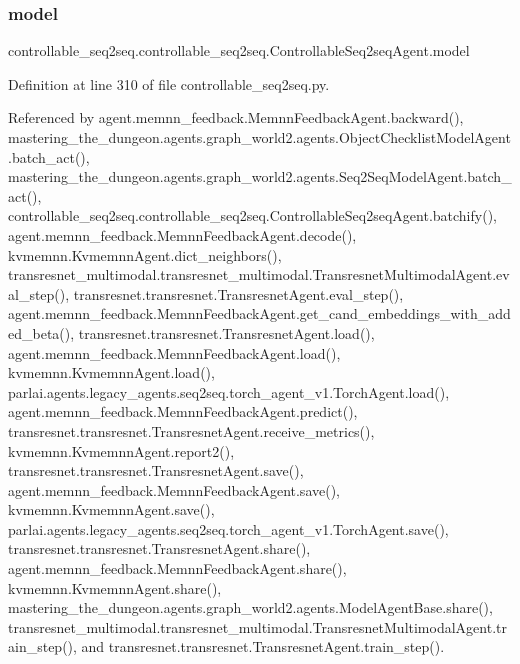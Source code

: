 \subsubsection{\texorpdfstring{model}{model}}
{\footnotesize\ttfamily controllable\+\_\+seq2seq.\+controllable\+\_\+seq2seq.\+Controllable\+Seq2seq\+Agent.\+model}



Definition at line 310 of file controllable\+\_\+seq2seq.\+py.



Referenced by agent.\+memnn\+\_\+feedback.\+Memnn\+Feedback\+Agent.\+backward(), mastering\+\_\+the\+\_\+dungeon.\+agents.\+graph\+\_\+world2.\+agents.\+Object\+Checklist\+Model\+Agent.\+batch\+\_\+act(), mastering\+\_\+the\+\_\+dungeon.\+agents.\+graph\+\_\+world2.\+agents.\+Seq2\+Seq\+Model\+Agent.\+batch\+\_\+act(), controllable\+\_\+seq2seq.\+controllable\+\_\+seq2seq.\+Controllable\+Seq2seq\+Agent.\+batchify(), agent.\+memnn\+\_\+feedback.\+Memnn\+Feedback\+Agent.\+decode(), kvmemnn.\+Kvmemnn\+Agent.\+dict\+\_\+neighbors(), transresnet\+\_\+multimodal.\+transresnet\+\_\+multimodal.\+Transresnet\+Multimodal\+Agent.\+eval\+\_\+step(), transresnet.\+transresnet.\+Transresnet\+Agent.\+eval\+\_\+step(), agent.\+memnn\+\_\+feedback.\+Memnn\+Feedback\+Agent.\+get\+\_\+cand\+\_\+embeddings\+\_\+with\+\_\+added\+\_\+beta(), transresnet.\+transresnet.\+Transresnet\+Agent.\+load(), agent.\+memnn\+\_\+feedback.\+Memnn\+Feedback\+Agent.\+load(), kvmemnn.\+Kvmemnn\+Agent.\+load(), parlai.\+agents.\+legacy\+\_\+agents.\+seq2seq.\+torch\+\_\+agent\+\_\+v1.\+Torch\+Agent.\+load(), agent.\+memnn\+\_\+feedback.\+Memnn\+Feedback\+Agent.\+predict(), transresnet.\+transresnet.\+Transresnet\+Agent.\+receive\+\_\+metrics(), kvmemnn.\+Kvmemnn\+Agent.\+report2(), transresnet.\+transresnet.\+Transresnet\+Agent.\+save(), agent.\+memnn\+\_\+feedback.\+Memnn\+Feedback\+Agent.\+save(), kvmemnn.\+Kvmemnn\+Agent.\+save(), parlai.\+agents.\+legacy\+\_\+agents.\+seq2seq.\+torch\+\_\+agent\+\_\+v1.\+Torch\+Agent.\+save(), transresnet.\+transresnet.\+Transresnet\+Agent.\+share(), agent.\+memnn\+\_\+feedback.\+Memnn\+Feedback\+Agent.\+share(), kvmemnn.\+Kvmemnn\+Agent.\+share(), mastering\+\_\+the\+\_\+dungeon.\+agents.\+graph\+\_\+world2.\+agents.\+Model\+Agent\+Base.\+share(), transresnet\+\_\+multimodal.\+transresnet\+\_\+multimodal.\+Transresnet\+Multimodal\+Agent.\+train\+\_\+step(), and transresnet.\+transresnet.\+Transresnet\+Agent.\+train\+\_\+step().

\mbox{\label{classcontrollable__seq2seq_1_1controllable__seq2seq_1_1ControllableSeq2seqAgent_a60838aecd16ef85d34519f6a744b1c5a}} 

